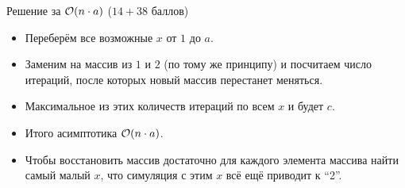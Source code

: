 \begin{frame}{Решение за $\mathcal{O}(n \cdot a)$ ($14 + 38$ баллов)}
  \begin{itemize}
  \item Переберём все возможные $x$ от $1$ до $a$.
  \item Заменим на массив из $1$ и $2$ (по тому же принципу) и посчитаем число итераций, после которых новый массив перестанет меняться.
  \item Максимальное из этих количеств итераций по всем $x$ и будет $c$.
  \item Итого асимптотика $\mathcal{O}(n \cdot a)$.
  \item Чтобы восстановить массив достаточно для каждого элемента массива найти самый малый $x$, что симуляция с этим $x$ всё ещё приводит к ``2''.
  \end{itemize}
\end{frame}




